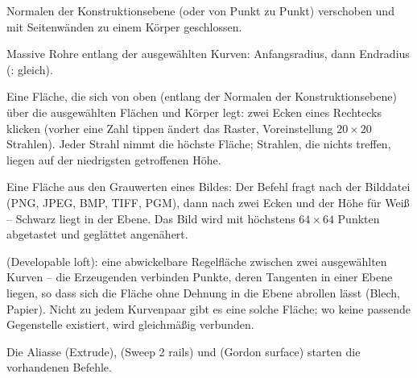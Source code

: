 \begin{description}
  Normalen der Konstruktionsebene (oder von Punkt zu Punkt) verschoben und mit Seitenwänden zu
  einem Körper geschlossen.
\item[\cmd{pipe}] Massive Rohre entlang der ausgewählten Kurven: Anfangsradius, dann Endradius
  (: gleich).
\item[\cmd{drape}] Eine Fläche, die sich von oben (entlang der Normalen der Konstruktionsebene)
  über die ausgewählten Flächen und Körper legt: zwei Ecken eines Rechtecks klicken (vorher eine
  Zahl tippen ändert das Raster, Voreinstellung $20 \times 20$ Strahlen). Jeder Strahl nimmt die
  höchste Fläche; Strahlen, die nichts treffen, liegen auf der niedrigsten getroffenen Höhe.
\item[\cmd{heightfield}] Eine Fläche aus den Grauwerten eines Bildes: Der Befehl fragt nach der
  Bilddatei (PNG, JPEG, BMP, TIFF, PGM), dann nach zwei Ecken und der Höhe für Weiß -- Schwarz
  liegt in der Ebene. Das Bild wird mit höchstens $64 \times 64$ Punkten abgetastet und geglättet
  angenähert.
\item[\cmd{devloft}] (Developable loft): eine abwickelbare Regelfläche zwischen zwei ausgewählten
  Kurven -- die Erzeugenden verbinden Punkte, deren Tangenten in einer Ebene liegen, so dass sich
  die Fläche ohne Dehnung in die Ebene abrollen lässt (Blech, Papier). Nicht zu jedem Kurvenpaar
  gibt es eine solche Fläche; wo keine passende Gegenstelle existiert, wird gleichmäßig verbunden.
\end{description}
Die Aliasse  (Extrude),  (Sweep 2 rails) und 
(Gordon surface) starten die vorhandenen Befehle.


